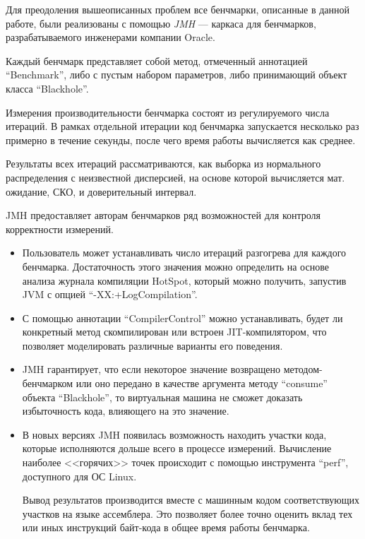 Для преодоления вышеописанных проблем все бенчмарки, описанные в данной работе, были реализованы
с помощью \textit{JMH}
--- каркаса для бенчмарков, разрабатываемого инженерами компании Oracle.

Каждый бенчмарк  представляет собой метод, отмеченный аннотацией ``Benchmark'', либо с пустым
набором параметров, либо принимающий объект класса ``Blackhole''.

Измерения производительности бенчмарка состоят из регулируемого числа итераций.
В рамках отдельной итерации код бенчмарка запускается несколько раз примерно в течение секунды,
после чего время работы вычисляется как среднее.

Результаты всех итераций рассматриваются, как выборка из нормального распределения с неизвестной
дисперсией, на основе которой вычисляется мат. ожидание, СКО, и доверительный интервал.

JMH предоставляет авторам бенчмарков ряд возможностей для контроля корректности измерений.
\begin{itemize}
    \item Пользователь может устанавливать число итераций разгогрева для каждого бенчмарка.
    Достаточность этого значения можно определить на основе анализа журнала компиляции HotSpot,
    который можно получить, запустив JVM с опцией ``-XX:+LogCompilation''.

    \item С помощью аннотации ``CompilerControl'' можно устанавливать, будет ли конкретный метод
    скомпилирован или встроен JIT-компилятором, что позволяет моделировать различные варианты
    его поведения.

    \item JMH гарантирует, что если некоторое значение возвращено методом-бенчмарком или оно
    передано в качестве аргумента методу ``consume'' объекта ``Blackhole'', то виртуальная машина
    не сможет доказать избыточность кода, влияющего на это значение.

    \item В новых версиях JMH появилась возможность находить участки кода, которые исполняются
    дольше всего в процессе измерений.
    Вычисление наиболее <<горячих>> точек происходит с помощью инструмента ``perf'',
    доступного для ОС Linux.

    Вывод результатов производится вместе с машинным кодом соответствующих участков на языке
    ассемблера.
    Это позволяет более точно оценить вклад тех или иных инструкций байт-кода в общее время работы
    бенчмарка.
\end{itemize}


